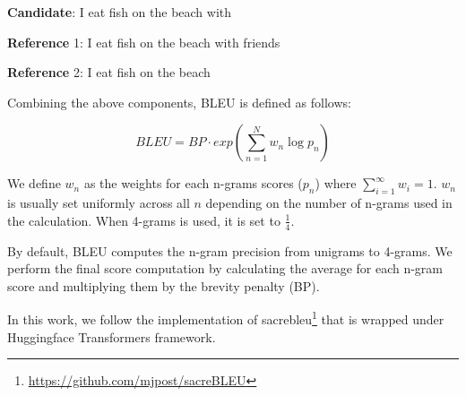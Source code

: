 \bigskip

\textbf{Candidate}: I eat fish on the beach with

\textbf{Reference} 1: I eat fish on the beach with friends

\textbf{Reference} 2: I eat fish on the beach

\bigskip

Combining the above components, BLEU is defined as follows:

\begin{equation}
    BLEU=BP\cdot exp\left( \sum_{n=1}^{N} w_n \log p_n \right)
\end{equation}

We define $w_n$ as the weights for each n-grams scores ($p_n$) where $\sum^{\infty}_{i=1} w_i = 1$. $w_n$ is usually set uniformly across all $n$ depending on the number of n-grams used in the calculation. When 4-grams is used, it is set to $\frac{1}{4}$.

By default, BLEU computes the n-gram precision from unigrams to 4-grams. We perform the final score computation by calculating the average for each n-gram score and multiplying them by the brevity penalty (BP).

In this work, we follow the implementation of sacrebleu\footnote{\url{https://github.com/mjpost/sacreBLEU}}  that is wrapped under Huggingface Transformers framework.